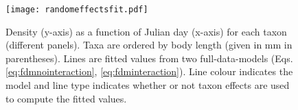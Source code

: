 \documentclass[12pt]{ecology}
\begin{document}




\begin{figure}
\texttt{[image: randomeffectsfit.pdf]}
\caption{Density (y-axis) as a function of Julian day (x-axis) for each taxon (different panels).  Taxa are ordered by body length (given in mm in parentheses).  Lines are fitted values from two full-data-models (Eqs. \ref{eq:fdmnointeraction}, \ref{eq:fdminteraction}).  Line colour indicates the model and line type indicates whether or not taxon effects are used to compute the fitted values.}
\label{fig:randomeffectsfit}
\end{figure}
\end{document}
